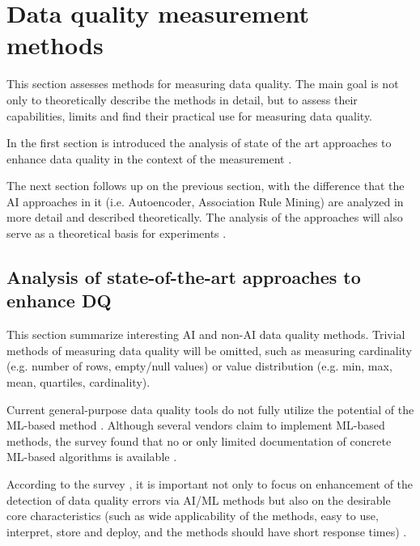 \chapter{Data quality measurement methods}
\label{ch:data_quality_measurement_methods}

		This section assesses methods for measuring data quality. The main goal is not only to theoretically describe the methods in detail, but to assess their capabilities, limits and find their practical use for measuring data quality.
		
		In the first section is introduced the analysis of state of the art approaches to enhance data quality in the context of the measurement . 

		The next section  follows up on the previous section, with the difference that the AI approaches in it (i.e. Autoencoder, Association Rule Mining) are analyzed in more detail and described theoretically. The analysis of the approaches will also serve as a theoretical basis for experiments .

	\section{Analysis of state-of-the-art approaches to enhance DQ}
	\label{sec:analysis_dq_state_of_art}
		
			This section summarize interesting AI and non-AI data quality methods. Trivial methods of measuring data quality will be omitted, such as measuring cardinality (e.g. number of rows, empty/null values) or value distribution (e.g. min, max, mean, quartiles, cardinality).
			
			Current general-purpose data quality tools do not fully utilize the potential of the ML-based method \cite{Ehrlinger2019}. Although several vendors claim to implement ML-based methods, the survey \cite{Ehrlinger2019} found that no or only limited documentation of concrete ML-based algorithms is available \cite{Ehrlinger2019}.		
		
			According to the survey \cite{Ehrlinger2019}, it is important not only to focus on enhancement of the detection of data quality errors via AI/ML methods but also on the desirable core characteristics (such as wide applicability of the methods, easy to use, interpret, store and deploy, and the methods should have short response times) \cite{Ehrlinger2019}.	
		
